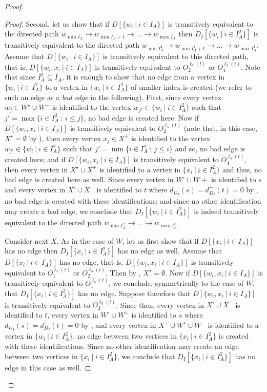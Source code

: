\documentclass[a4paper,11pt]{article}
\theoremstyle{plain}
\newtheorem{identification rule}{Identification Rule}
\theoremstyle{definition}
\theoremstyle{remark}
\newenvironment{claimproof}{\begin{proof}\renewcommand{\qedsymbol}{\claimqed}}{\end{proof}\renewcommand{\qedsymbol}{\plainqed}}
\let\plainqed\qedsymbol
\newcommand{\claimqed}{$\lrcorner$}
\begin{document}
\begin{proof}
\begin{claimproof}
Second, let us show that if $D[\{w_i~|~i \in I_A\}]$ is transitively equivalent to the directed path 
$w_{\min I_A} \rightarrow w_{\min I_A +1} \rightarrow \ldots \rightarrow w_{\max I_A}$ then
$D_I[\{w_i~|~i \in I_A^2\}]$ is transitively equivalent to the directed path 
$w_{\min I_A^2} \rightarrow w_{\min I_A^2 +1} \rightarrow \ldots \rightarrow w_{\max I_A^2}$.
Assume that $D[\{w_i~|~i \in I_A\}]$ is transitively equivalent to this directed path, 
that is, $D[\{w_i,x_i~|~i \in I_A\}]$ is transitively equivalent to $O_2^{\ell_5(t)}$ or $O_4^{\ell_5(t)}$.
Note that since $I_A^2 \subseteq I_A$, it is enough to show that no edge from a vertex in $\{w_i~|~i \in I_A^2\}$ to a vertex in $\{w_i~|~i \in I_A^2\}$ of smaller index is created (we refer to such an edge as a \emph{bad edge} in the following).
First, since every vertex $w_j \in W^\star \cup W^-$ is identified to the vertex $w_{j'} \in \{w_i~|~i \in I_A^2\}$ such that $j' = \max \{i \in I_A^2~:~ i \leq j\}$, no bad edge is created here.
Now if $D[\{w_i,x_i~|~i \in I_A\}]$ is transitively equivalent to $O_2^{\ell_5(t)}$ (note that, in this case, $X^\star = \emptyset$ by ), then every vertex $x_j \in X^+$ is identified to the vertex $w_{j'} \in \{w_i~|~i \in I_A^2\}$ such that $j' = \min \{i \in I_A^2~:~j \leq i\}$ and so, no bad edge is created here; and if $D[\{w_i,x_i~|~i \in I_A\}]$ is transitively equivalent to $O_4^{\ell_5(t)}$, then every vertex in $X^\star \cup X^+$ is identified to a vertex in $\{x_i~|~i \in I_A^2\}$ and thus, no bad edge is created here as well. 
Since every vertex in $W^\circ \cup W+$ is identified to $s$ and every vertex in $X^\circ \cup X^-$ is identified to $t$ where $d^-_{D_I}(s) = d^+_{D_I}(t) = 0$ by , no bad edge is created with these identifications;
and since no other identification may create a bad edge, we conclude that $D_I[\{w_i~|~i \in I_A^2\}]$ is indeed transitively equivalent to the directed path $w_{\min I_A^2} \rightarrow \ldots \rightarrow w_{\max I_A^2}$.

Consider next $X$. As in the case of $W$, let us first show that if $D[\{x_i~|~i \in I_A\}]$ has no edge then $D_I[\{x_i~|~i \in I_A^2\}]$ has no edge as well. 
Assume that $D[\{x_i~|~i \in I_A\}]$ has no edge, that is, $D[\{w_i,x_i~|~i \in I_A\}]$ is transitively equivalent to $O_1^{\ell_5(t)}$ or $O_2^{\ell_5(t)}$.
Then by , $X^\star = \emptyset$.
Now if $D[\{w_i,x_i~|~i \in I_A\}]$ is transitively equivalent to $O_1^{\ell_5(t)}$,
we conclude, symmetrically to the case of $W$, that $D_I[\{x_i~|~i \in I_A^2\}]$ has no edge.
Suppose therefore that $D[\{w_i,x_i~|~i \in I_A\}]$ is transitively equivalent to $O_2^{\ell_5(t)}$.
Since then, every vertex in $X^\circ \cup X^-$ is identified to $t$, every vertex in $W^\circ \cup W^+$ is identified to $s$  where $d^-_{D_I}(s) = d^+_{D_I}(t) = 0$ by ,
and every vertex in $X^+ \cup W^\star \cup W^-$ is identified to a vertex in $\{w_i~|~i \in I_A^2\}$, 
no edge between two vertices in $\{x_i~|~i \in I_A^2\}$ is created with these identifications.
Since no other identification may create an edge between two vertices in $\{x_i~|~i \in I_A^2\}$, 
we conclude that $D_I[\{x_i~|~i \in I_A^2\}]$ has no edge in this case as well.


\end{claimproof}
\end{proof}
\end{document}
